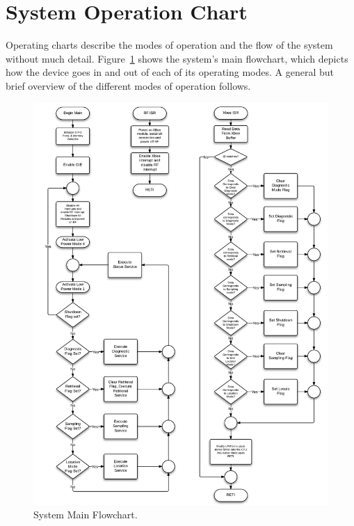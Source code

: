 \section{System Operation Chart}
\label{sec:operatingChart}


Operating charts describe the modes of operation and the flow of the system without much detail. Figure~\ref{fig:systemFlowchart} shows the system's main flowchart, which depicts how the device goes in and out of each of its operating modes.  A general but brief overview of the different modes of operation follows.

\begin{figure}[!ht]
	\centering
	\includegraphics[width=\textwidth]{img/SystemFlowchart}
	\caption{System Main Flowchart. \label{fig:systemFlowchart}}
\end{figure}

